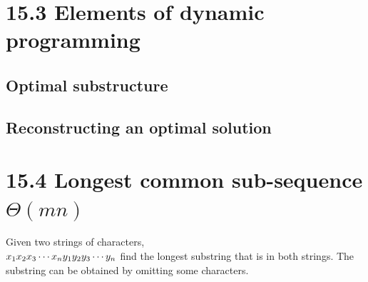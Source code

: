\documentclass[a4paper]{article}
\begin{document}
\section*{15.3 Elements of dynamic programming}

\subsection*{Optimal substructure}

\subsection*{Reconstructing an optimal solution}

\section*{15.4 Longest common sub-sequence $\Theta(mn)$}
Given two strings of characters,\\
$
x_1x_2x_3\cdots x_n\\
y_1y_2y_3\cdots y_n\\
$
find the longest substring that is in both strings. The substring can be obtained by omitting some characters.
\end{document}
